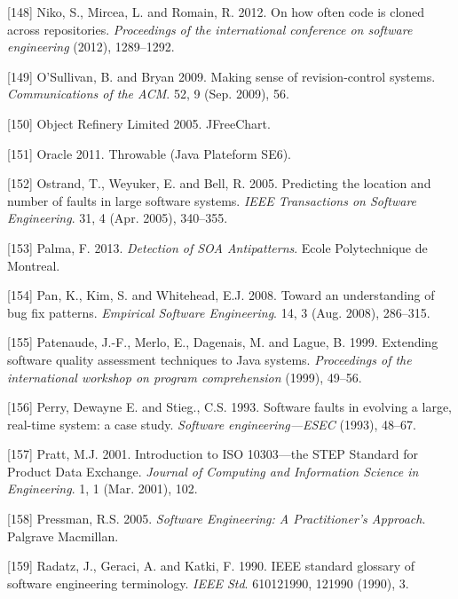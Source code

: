 \documentclass[12pt]{report}
\begin{document}
\hypertarget{ref-Niko2012}{}
{[}148{]} Niko, S., Mircea, L. and Romain, R. 2012. On how often code is
cloned across repositories. \emph{Proceedings of the international
conference on software engineering} (2012), 1289--1292.

\hypertarget{ref-OSullivan2009}{}
{[}149{]} O'Sullivan, B. and Bryan 2009. Making sense of
revision-control systems. \emph{Communications of the ACM}. 52, 9 (Sep.
2009), 56.

\hypertarget{ref-ObjectRefineryLimited2005}{}
{[}150{]} Object Refinery Limited 2005. JFreeChart.

\hypertarget{ref-Oracle2011}{}
{[}151{]} Oracle 2011. Throwable (Java Plateform SE6).

\hypertarget{ref-Ostrand2005}{}
{[}152{]} Ostrand, T., Weyuker, E. and Bell, R. 2005. Predicting the
location and number of faults in large software systems. \emph{IEEE
Transactions on Software Engineering}. 31, 4 (Apr. 2005), 340--355.

\hypertarget{ref-Palma2013}{}
{[}153{]} Palma, F. 2013. \emph{Detection of SOA Antipatterns}. Ecole
Polytechnique de Montreal.

\hypertarget{ref-Pan2008}{}
{[}154{]} Pan, K., Kim, S. and Whitehead, E.J. 2008. Toward an
understanding of bug fix patterns. \emph{Empirical Software
Engineering}. 14, 3 (Aug. 2008), 286--315.

\hypertarget{ref-Patenaude1999}{}
{[}155{]} Patenaude, J.-F., Merlo, E., Dagenais, M. and Lague, B. 1999.
Extending software quality assessment techniques to Java systems.
\emph{Proceedings of the international workshop on program
comprehension} (1999), 49--56.

\hypertarget{ref-PerryDewayneE.1993}{}
{[}156{]} Perry, Dewayne E. and Stieg., C.S. 1993. Software faults in
evolving a large, real-time system: a case study. \emph{Software
engineering---ESEC} (1993), 48--67.

\hypertarget{ref-Pratt2001}{}
{[}157{]} Pratt, M.J. 2001. Introduction to ISO 10303---the STEP
Standard for Product Data Exchange. \emph{Journal of Computing and
Information Science in Engineering}. 1, 1 (Mar. 2001), 102.

\hypertarget{ref-Pressman2005}{}
{[}158{]} Pressman, R.S. 2005. \emph{Software Engineering: A
Practitioner's Approach}. Palgrave Macmillan.

\hypertarget{ref-Radatz1990}{}
{[}159{]} Radatz, J., Geraci, A. and Katki, F. 1990. IEEE standard
glossary of software engineering terminology. \emph{IEEE Std}.
610121990, 121990 (1990), 3.
\end{document}
